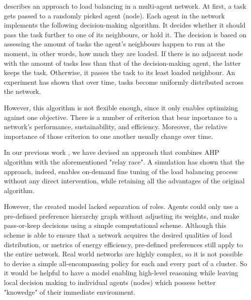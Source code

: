 \cite{gorodetskii-2012} describes an approach to load balancing in a multi-agent network.
At first, a task gets passed to a randomly picked agent (node).
Each agent in the network implements the following decision-making algorithm.
It decides whether it should pass the task further to one of its neighbours, or hold it.
The decision is based on assessing the amount of tasks the agent's neighbours happen to run at the moment, in other words, how much they are loaded.
If there is no adjacent node with the amount of tasks less than that of the decision-making agent, the latter keeps the task.
Otherwise, it passes the task to its least loaded neighbour.
An experiment has shown that over time, tasks become uniformly distributed across the network.

However, this algorithm is not flexible enough, since it only enables optimizing against one objective.
There is a number of criterion that bear inportance to a network's performance, sustainability, and efficiency.
Moreover, the relative importance of those criterion to one another usually change over time.

In our previous work \cite{murashov-2022}, we have devised an approach that combines AHP algorithm with the aforementioned "relay race".
A simulation has shown that the approach, indeed, enables on-demand fine tuning of the load balancing process without any direct intervention, while retaining all the advantages of the original algorithm.

However, the created model lacked separation of roles.
Agents could only use a pre-defined preference hierarchy graph without adjusting its weights, and make pass-or-keep decisions using a simple computational scheme.
Although this scheme is able to ensure that a network acquires the desired qualities of load distribution, or metrics of energy efficiency, pre-defined preferences still apply to the entire network.
Real world networks are highly complex, so it is not possible to devise a simple all-encompassing policy for each and every part of a cluster.
So it would be helpful to have a model enabling high-level reasoning while leaving local decision making to individual agents (nodes) which possess better "knowedge" of their immediate environment.
